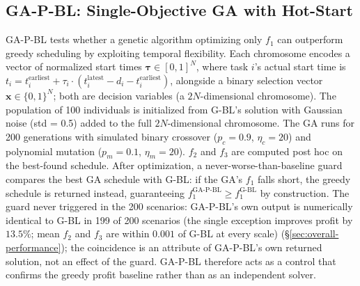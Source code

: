 \documentclass[preprint,12pt,authoryear]{elsarticle}
\begin{document}
\subsection{GA-P-BL: Single-Objective GA with Hot-Start}
\label{sec:ga-p-bl}
GA-P-BL tests whether a genetic algorithm optimizing only $f_1$ can
outperform greedy scheduling by exploiting temporal flexibility.
Each chromosome encodes a vector of normalized start times
$\boldsymbol{\tau} \in [0,1]^N$, where task $i$'s actual start time is
$t_i = t_i^{\text{earliest}} + \tau_i \cdot (t_i^{\text{latest}} - d_i - t_i^{\text{earliest}})$,
alongside a binary selection vector $\mathbf{x} \in \{0,1\}^N$; both are
decision variables (a $2N$-dimensional chromosome).
The population of 100 individuals is initialized from G-BL's solution
with Gaussian noise (std = 0.5) added to the full $2N$-dimensional chromosome.
The GA runs for 200 generations with simulated binary crossover
($p_c = 0.9$, $\eta_c = 20$) and polynomial mutation
($p_m = 0.1$, $\eta_m = 20$).
$f_2$ and $f_3$ are computed post hoc on the best-found schedule.
After optimization, a never-worse-than-baseline guard compares the best GA
schedule with G-BL: if the GA's $f_1$ falls short, the greedy schedule is
returned instead, guaranteeing $f_1^{\text{GA-P-BL}} \ge f_1^{\text{G-BL}}$ by
construction. The guard never triggered in the 200 scenarios: GA-P-BL's own
output is numerically identical to G-BL in 199 of 200 scenarios (the single
exception improves profit by $13.5\%$; mean $f_2$ and $f_3$ are within
$0.001$ of G-BL at every scale)
(\S\ref{sec:overall-performance}); the coincidence is an attribute of
GA-P-BL's own returned solution, not an effect of the guard. GA-P-BL
therefore acts as a control that confirms the greedy profit baseline rather
than as an independent solver.
\end{document}
